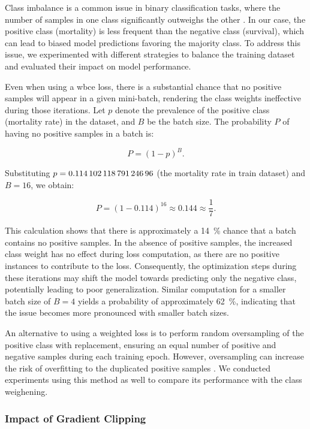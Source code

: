 Class imbalance is a common issue in binary classification tasks, where the number of samples in one class significantly outweighs the other \cite{LearningImbalancedData2009}. In our case, the positive class (mortality) is less frequent than the negative class (survival), which can lead to biased model predictions favoring the majority class. To address this issue, we experimented with different strategies to balance the training dataset and evaluated their impact on model performance.

Even when using a \gls{wbce} loss, there is a substantial chance that no positive samples will appear in a given mini-batch, rendering the class weights ineffective during those iterations. Let \( p \) denote the prevalence of the positive class (mortality rate) in the dataset, and \( B \) be the batch size. The probability \( P \) of having no positive samples in a batch is:

\[
P = (1 - p)^{B}.
\]

Substituting \( p = \num{0.11410211879124696} \) (the mortality rate in train dataset) and \( B = 16 \), we obtain:

\[
P = (1 - 0.114)^{16} \approx 0.144 \approx \frac{1}{7}.
\]

This calculation shows that there is approximately a \qty{14}{\percent} chance that a batch contains no positive samples. In the absence of positive samples, the increased class weight has no effect during loss computation, as there are no positive instances to contribute to the loss. Consequently, the optimization steps during these iterations may shift the model towards predicting only the negative class, potentially leading to poor generalization. Similar computation for a smaller batch size of \( B = 4 \) yields a probability of approximately \qty{62}{\percent}, indicating that the issue becomes more pronounced with smaller batch sizes.

An alternative to using a weighted loss is to perform random oversampling of the positive class with replacement, ensuring an equal number of positive and negative samples during each training epoch.  However, oversampling can increase the risk of overfitting to the duplicated positive samples \cite[][1267]{LearningImbalancedData2009}. We conducted experiments using this method as well to compare its performance with the class weighening.

\subsubsection*{Impact of Gradient Clipping}
\label{sec:clipping}


